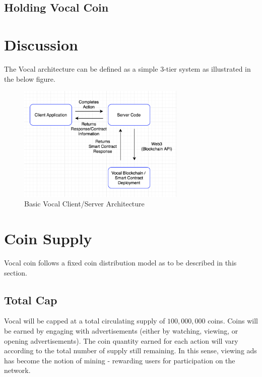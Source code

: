 \documentclass[conference]{IEEEtran}
\begin{document}
    \subsection{Holding Vocal Coin}

    \section{Discussion}

    The Vocal architecture can be defined as a simple 3-tier system as illustrated in the below figure.

    \begin{figure}[t]
      \includegraphics[width=8cm]{assets/architecture.png}
      \caption{Basic Vocal Client/Server Architecture}
      \centering
    \end{figure}


    
    \section{Coin Supply}

   Vocal coin follows a fixed coin distribution model as to be described in this section.

    \subsection{Total Cap}
   Vocal will be capped at a total circulating supply of $100,000,000$ coins. Coins will be earned by engaging with advertisements (either by watching, viewing, or opening advertisements).
     The coin quantity earned for each action will vary according to the total number of supply still remaining. In this sense, viewing ads has become the notion of mining - rewarding users for participation on the network.
\end{document}
